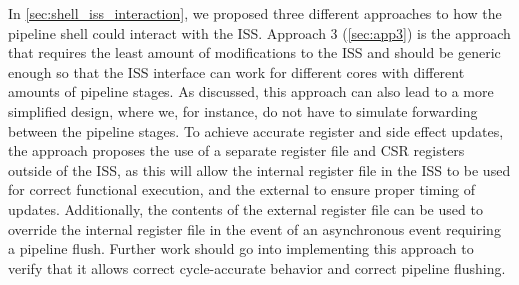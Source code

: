%
%
%

In \cref{sec:shell_iss_interaction}, we proposed three different approaches to how the pipeline shell could interact with the ISS. Approach 3 (\cref{sec:app3}) is the approach that requires the least amount of modifications to the ISS and should be generic enough so that the ISS interface can work for different cores with different amounts of pipeline stages. As discussed, this approach can also lead to a more simplified design, where we, for instance, do not have to simulate forwarding between the pipeline stages. To achieve accurate register and side effect updates, the approach proposes the use of a separate register file and CSR registers outside of the ISS, as this will allow the internal register file in the ISS to be used for correct functional execution, and the external to ensure proper timing of updates. Additionally, the contents of the external register file can be used to override the internal register file in the event of an asynchronous event requiring a pipeline flush. Further work should go into implementing this approach to verify that it allows correct cycle-accurate behavior and correct pipeline flushing.

